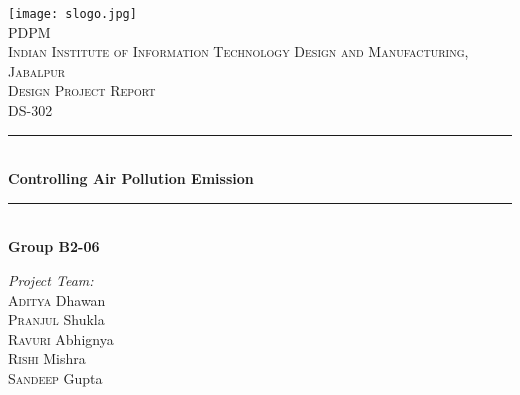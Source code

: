 \documentclass[12pt]{article}
\begin{document}
\begin{titlepage}

\newcommand{\HRule}{\rule{\linewidth}{0.5mm}} %

\center %
 

\texttt{[image: slogo.jpg]}\\[0.5cm]

\textsc{ PDPM } \\
\textsc{Indian Institute of Information Technology Design and Manufacturing, Jabalpur}\\[1cm] %
\textsc{\Large Design Project Report}\\[0.5cm] %
\textsc{\large DS-302}\\[0.5cm] %


\HRule \\[0.4cm]
{ \huge \bfseries Controlling Air Pollution Emission}\\[0.2cm] %
\HRule \\[0.5cm]

\textbf{Group B2-06}\\

\begin{minipage}{0.4\textwidth}
\begin{flushleft} \large
\emph{Project Team:}\\[0.01cm]
\textsc{Aditya} Dhawan \\
\textsc{Pranjul} Shukla \\
\textsc{Ravuri} Abhignya \\
\textsc{Rishi} Mishra\\ %
\textsc{Sandeep} Gupta \\ 


\end{flushleft}
\end{minipage}
\end{titlepage}
\end{document}
